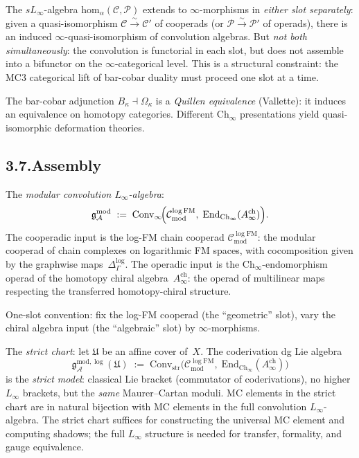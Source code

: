 \documentclass[11pt]{report}
\theoremstyle{definition}
\theoremstyle{remark}
\providecommand{\cA}{\mathcal{A}}
\providecommand{\cC}{\mathcal{C}}
\providecommand{\cP}{\mathcal{P}}
\providecommand{\Convinf}{\mathrm{Conv}_\infty}
\providecommand{\Convstr}{\mathrm{Conv}_{\mathrm{str}}}
\numberwithin{equation}{section}
\begin{document}
The $sL_\infty$-algebra $\mathrm{hom}_\alpha(\cC,\cP)$ extends to
$\infty$-morphisms in \emph{either slot separately}: given a
quasi-isomorphism $\cC\xrightarrow{\sim}\cC'$ of cooperads (or
$\cP\xrightarrow{\sim}\cP'$ of operads), there is an induced
$\infty$-quasi-isomorphism of convolution algebras. But
\emph{not both simultaneously}: the convolution is functorial in
each slot, but does not assemble into a bifunctor on the
$\infty$-categorical level. This is a structural constraint:
the MC3 categorical lift of bar-cobar duality must proceed one
slot at a time.

The bar-cobar adjunction $B_\kappa\dashv\Omega_\kappa$ is a
\emph{Quillen equivalence} (Vallette): it induces an equivalence
on homotopy categories. Different $\mathrm{Ch}_\infty$
presentations yield quasi-isomorphic deformation theories.

\subsection*{3.7.\enspace Assembly}

The \emph{modular convolution $L_\infty$-algebra}:
\begin{equation}\label{eq:pref-convolution}
\mathfrak g^{\mathrm{mod}}_\cA
\;:=\;
\Convinf\!\Bigl(
\cC^{\log\mathrm{FM}}_{\mathrm{mod}},\;
\mathrm{End}_{\mathrm{Ch}_\infty}(A^{\mathrm{ch}}_\infty)
\Bigr).
\end{equation}
The cooperadic input is the log-FM chain cooperad
$\cC^{\log\mathrm{FM}}_{\mathrm{mod}}$: the modular cooperad of
chain complexes on logarithmic FM spaces, with cocomposition given
by the graphwise maps~$\Delta^{\log}_\Gamma$. The operadic input
is the $\mathrm{Ch}_\infty$-endomorphism operad of the homotopy
chiral algebra~$A^{\mathrm{ch}}_\infty$: the operad of multilinear
maps respecting the transferred homotopy-chiral structure.

One-slot convention: fix the log-FM cooperad (the
``geometric'' slot), vary the chiral algebra input (the
``algebraic'' slot) by $\infty$-morphisms.

The \emph{strict chart}: let $\mathfrak U$ be an affine cover
of~$X$. The coderivation dg Lie algebra
\[
\mathfrak g^{\mathrm{mod},\log}_\cA(\mathfrak U)
\;:=\;
\Convstr\!\bigl(
\cC^{\log\mathrm{FM}}_{\mathrm{mod}},\;
\mathrm{End}_{\mathrm{Ch}_\infty}(A^{\mathrm{ch}}_\infty)
\bigr)
\]
is the \emph{strict model}: classical Lie bracket (commutator of
coderivations), no higher $L_\infty$ brackets, but the \emph{same}
Maurer--Cartan moduli. MC elements in the strict chart are in
natural bijection with MC elements in the full convolution
$L_\infty$-algebra. The strict chart suffices for constructing the
universal MC element and computing shadows; the full $L_\infty$
structure is needed for transfer, formality, and gauge equivalence.
\end{document}
